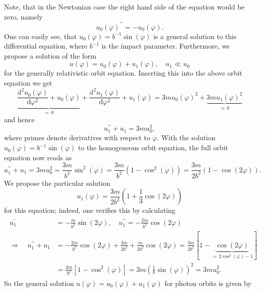 \documentclass[a4paper,11pt]{article}
\numberwithin{equation}{section}
\begin{document}
{Note, that in the Newtonian case the right hand side of the equation would be zero, namely \begin{equation}
u_0(\varphi)^{\prime\prime} = -u_0(\varphi).
\end{equation} One can easily see, that $u_0(\varphi) = b^{-1}\sin(\varphi)$ is a general solution to this differential equation, where $b^{-1}$ is the impact parameter. Furthermore, we propose a solution of the form \begin{equation}
u(\varphi) = u_0(\varphi) + u_1(\varphi), \quad u_1 \ll u_0
\end{equation} for the generally relativistic orbit equation. Inserting this into the above orbit equation we get \begin{equation}
\underbrace{\frac{\mathrm{d}^2u_0(\varphi)}{\mathrm{d}\varphi^2} + u_0(\varphi)}_{=\,0} + \frac{\mathrm{d}^2u_1(\varphi)}{\mathrm{d}\varphi^2} + u_1(\varphi) = 3mu_0(\varphi)^2 + \underbrace{3mu_1(\varphi)^2}_{\approx \, 0}
\end{equation} and hence \begin{equation}
u_1^{\prime\prime} + u_1 = 3mu_0^2,
\end{equation} where primes  denote derivatives with respect to $\varphi$. With the solution $u_0(\varphi) = b^{-1}\sin(\varphi)$ to the homogeneous orbit equation, the full orbit equation now reads as \begin{equation}
u_1^{\prime\prime} + u_1 = 3mu_0^2 = \frac{3m}{b^2}\sin^2(\varphi) = \frac{3m}{b^2}(1-\cos^2(\varphi)) = \frac{3m}{2b^2}(1-\cos(2\varphi)).
\end{equation} We propose the particular solution \begin{equation}
u_1(\varphi) = \frac{3m}{2b^2}\left(1 + \frac{1}{3}\cos(2\varphi)\right)
\end{equation} for this equation; indeed, one verifies this by calculating \begin{align}
\begin{aligned}
u_1^{\prime} &= -\frac{m}{b^2}\sin(2\varphi), \quad u_1^{\prime\prime} = -\frac{2m}{b^2}\cos(2\varphi) \\
\Rightarrow \quad u_1^{\prime\prime} + u_1 &= -\frac{2m}{b^2}\cos(2\varphi) + \frac{3m}{2b^2} + \frac{m}{2b^2}\cos(2\varphi) = \frac{3m}{2b^2}\left[1-\underbrace{\cos(2\varphi)}_{=\,2\cos^2(\varphi)-1}\right] \\
&=\frac{3m}{b^2}[1-\cos^2(\varphi)] = 3m\left(\frac{1}{b}\sin(\varphi)\right)^2 = 3mu_0^2.
\end{aligned}
\end{align} So the general solution $u(\varphi) = u_0(\varphi) + u_1(\varphi)$ for photon orbits is given by \begin{equation}

\end{equation}}
\end{document}
